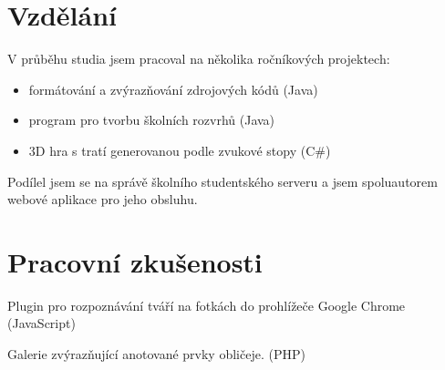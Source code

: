 \documentclass[]{deedy-resume-openfont}
\begin{document}
%
%



\begin{minipage}[t]{0.8\textwidth} 

\sectionsep


\section{Vzdělání} 


\sectionsep

\vspace{\topsep}
\begin{tightemize}
\item V průběhu studia jsem pracoval na několika ročníkových projektech:
    \begin{itemize}
    \item formátování a zvýrazňování zdrojových kódů (Java)
    \item program pro tvorbu školních rozvrhů (Java)
    \item 3D hra s tratí generovanou podle zvukové stopy (C\#)
    \end{itemize}
\item Podílel jsem se na správě školního studentského serveru a jsem spoluautorem webové aplikace pro jeho obsluhu.
\end{tightemize}
\sectionsep

\descript{}
\sectionsep


\section{Pracovní zkušenosti}

\begin{tightemize}
\item Plugin pro rozpoznávání tváří na fotkách do prohlížeče Google Chrome (JavaScript)
\item Galerie zvýrazňující anotované prvky obličeje. (PHP)
\end{tightemize}
\sectionsep



\end{minipage}
\end{document}
